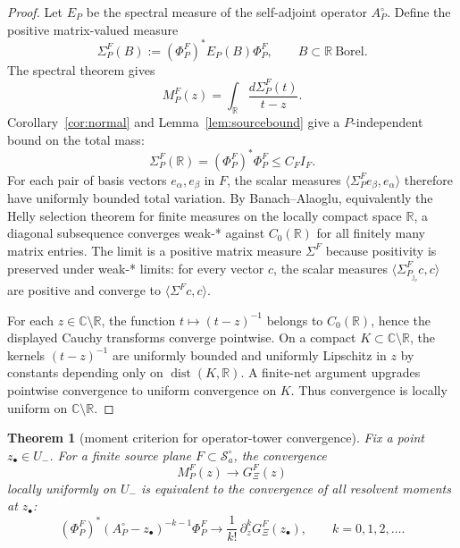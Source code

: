 \documentclass[11pt]{amsart}
\newtheorem{theorem}{Theorem}[section]
\theoremstyle{definition}
\theoremstyle{remark}
\theoremstyle{definition}
\newcommand{\cS}{\mathcal{S}}
\newcommand{\R}{\mathbb{R}}
\newcommand{\C}{\mathbb{C}}
\newcommand{\GXi}{G_\Xi}
\begin{document}
\begin{proof}
Let $E_P$ be the spectral measure of the self-adjoint operator $A_P^\circ$.  Define the positive
matrix-valued measure
\[
   \Sigma_P^F(B):=(\Phi_P^F)^*E_P(B)\Phi_P^F,\qquad B\subset\R\ \text{Borel}.
\]
The spectral theorem gives
\[
   M_P^F(z)=\int_\R\frac{d\Sigma_P^F(t)}{t-z}.
\]
Corollary~\ref{cor:normal} and Lemma~\ref{lem:sourcebound} give a $P$-independent bound on the total
mass:
\[
   \Sigma_P^F(\R)=(\Phi_P^F)^*\Phi_P^F\le C_F I_F .
\]
For each pair of basis vectors $e_\alpha,e_\beta$ in $F$, the scalar measures
$\langle\Sigma_P^F e_\beta,e_\alpha\rangle$ therefore have uniformly bounded total variation.  By
Banach--Alaoglu, equivalently the Helly selection theorem for finite measures on the locally compact space
$\R$, a diagonal subsequence converges weak-* against $C_0(\R)$ for all finitely many matrix entries.  The
limit is a positive matrix measure $\Sigma^F$ because positivity is preserved under weak-* limits:
for every vector $c$, the scalar measures
$\langle\Sigma_{P_{j_\nu}}^F c,c\rangle$ are positive and converge to
$\langle\Sigma^F c,c\rangle$.

For each $z\in\C\setminus\R$, the function $t\mapsto(t-z)^{-1}$ belongs to $C_0(\R)$, hence the displayed
Cauchy transforms converge pointwise.  On a compact $K\subset\C\setminus\R$, the kernels
$(t-z)^{-1}$ are uniformly bounded and uniformly Lipschitz in $z$ by constants depending only on
$\operatorname{dist}(K,\R)$.  A finite-net argument upgrades pointwise convergence to uniform convergence
on $K$.  Thus convergence is locally uniform on $\C\setminus\R$.
\end{proof}

\begin{theorem}[moment criterion for operator-tower convergence]\label{thm:moment-arp}
Fix a point $z_\bullet\in U_-$.  For a finite source plane $F\subset\cS_a^\circ$, the convergence
\[
   M_P^F(z)\longrightarrow \GXi^F(z)
\]
locally uniformly on $U_-$ is equivalent to the convergence of all resolvent moments at $z_\bullet$:
\[
   (\Phi_P^F)^*(A_P^\circ-z_\bullet)^{-k-1}\Phi_P^F
   \longrightarrow
   \frac{1}{k!}\,\partial_z^k\GXi^F(z_\bullet),
   \qquad k=0,1,2,\ldots .
\]
\end{theorem}
\end{document}
